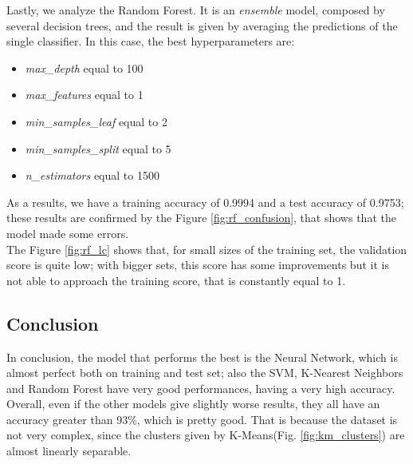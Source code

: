 Lastly, we analyze the Random Forest. It is an \emph{ensemble} model, composed by several decision trees, and the result is given by averaging the predictions of the single classifier.
In this case, the best hyperparameters are:
\begin{itemize}
\item \emph{max\_depth} equal to 100
\item \emph{max\_features} equal to 1
\item \emph{min\_samples\_leaf} equal to 2
\item \emph{min\_samples\_split} equal to 5
\item \emph{n\_estimators} equal to 1500
\end{itemize}
As a results, we have a training accuracy of 0.9994 and a test accuracy of 0.9753; these results are confirmed by the Figure \ref{fig:rf_confusion}, that shows that the model made some errors.\\
The Figure \ref{fig:rf_lc} shows that, for small sizes of the training set, the validation score is quite low; with bigger sets, this score has some improvements but it is not able to approach the training score, that is constantly equal to 1.

\subsection{Conclusion}
In conclusion, the model that performs the best is the Neural Network, which is almost perfect both on training and test set; also the SVM, K-Nearest Neighbors and Random Forest have very good performances, having a very high accuracy.\\
Overall, even if the other models give slightly worse results, they all have an accuracy greater than 93\%, which is pretty good. That is because the dataset is not very complex, since the clusters given by K-Means(Fig. \ref{fig:km_clusters}) are almost linearly separable.
